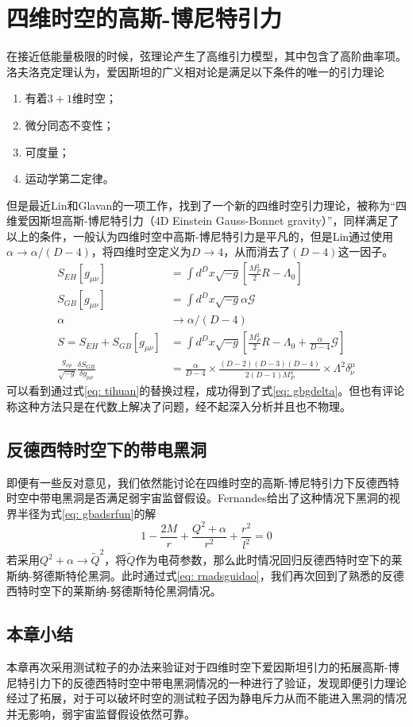 \chapter{四维时空的高斯-博尼特引力}
在接近低能量极限的时候，弦理论产生了高维引力模型，其中包含了高阶曲率项。洛夫洛克定理认为，爱因斯坦的广义相对论是满足以下条件的唯一的引力理论\citep{lanczos1938remarkable,lovelock1971einstein,lovelock1972four}
\begin{enumerate}
    \item 有着$3+1$维时空；
    \item 微分同态不变性；
    \item 可度量；
    \item 运动学第二定律。
\end{enumerate}

但是最近Lin和Glavan的一项工作，找到了一个新的四维时空引力理论，被称为“四维爱因斯坦高斯-博尼特引力（4D Einstein Gauss-Bonnet gravity）”，同样满足了以上的条件\citep{glavan2020einstein}，一般认为四维时空中高斯-博尼特引力是平凡的，但是Lin通过使用$\alpha\rightarrow \alpha/\left(D-4\right)$，将四维时空定义为$D\rightarrow 4$，从而消去了$\left(D-4\right)$这一因子。
\begin{align}
    S_{EH}\left[g_{\mu \nu}\right]&=\int d^D x \sqrt{-g}\left[\frac{M_P^2}{2}R-\Lambda_0\right] \\
    S_{GB}\left[g_{\mu \nu}\right]&=\int d^Dx\sqrt{-g}\alpha \mathcal{G} \\
    \alpha&\rightarrow \alpha/\left(D-4\right) \label{eq: tihuan} \\
    S=S_{EH}+S_{GB}\left[g_{\mu \nu}\right]&=\int d^Dx\sqrt{-g} \left[\frac{M_P^2}{2}R-\Lambda_0+\frac{\alpha}{D-4}\mathcal{G}\right] \\
    \frac{g_{\nu \rho}}{\sqrt{-g}}\frac{\delta S_{GB}}{\delta g_{\mu \rho}}&=\frac{\alpha}{D-4} \times \frac{\left(D-2\right)\left(D-3\right)\left(D-4\right)}{2\left(D-1\right)M_P^4}\times \Lambda^2 \delta^\mu_\nu \label{eq: gbgdelta}
\end{align}
可以看到通过式\eqref{eq: tihuan}的替换过程，成功得到了式\eqref{eq: gbgdelta}。但也有评论称这种方法只是在代数上解决了问题，经不起深入分析并且也不物理\citep{gurses2020comment}。
\section{反德西特时空下的带电黑洞}
即便有一些反对意见，我们依然能讨论在四维时空的高斯-博尼特引力下反德西特时空中带电黑洞是否满足弱宇宙监督假设。Fernandes给出了这种情况下黑洞的视界半径为式\eqref{eq: gbadsrfun}的解\citep{fernandes2020charged}
\begin{equation}\label{eq: gbadsrfun}
    1-\frac{2M}{r}+\frac{Q^2+\alpha}{r^2}+\frac{r^2}{l^2}=0
\end{equation}
若采用$Q^2+\alpha \rightarrow \tilde{Q}^2 $，将$\tilde{Q}$作为电荷参数，那么此时情况回归反德西特时空下的莱斯纳-努德斯特伦黑洞。此时通过式\eqref{eq: rnadsguidao}，我们再次回到了熟悉的反德西特时空下的莱斯纳-努德斯特伦黑洞情况。

\section{本章小结}
本章再次采用测试粒子的办法来验证对于四维时空下爱因斯坦引力的拓展高斯-博尼特引力下的反德西特时空中带电黑洞情况的一种进行了验证，发现即便引力理论经过了拓展，对于可以破坏时空的测试粒子因为静电斥力从而不能进入黑洞的情况并无影响，弱宇宙监督假设依然可靠。